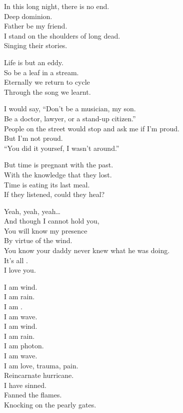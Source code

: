 
In this long night, there is no end. \\
Deep dominion. \\
Father be my friend. \\
I stand on the shoulders of  long dead. \\
Singing their stories. \\


Life is but an eddy. \\
So be a leaf in a stream. \\
Eternally we return to cycle \\
Through the song we learnt. \\


I would say, ``Don't be a musician, my son. \\
Be a doctor, lawyer, or a stand-up citizen.'' \\
People on the street would stop and ask me if I'm proud. \\
But I'm not proud. \\
``You did it yoursef, I wasn't around.'' \\


But time is pregnant with the past. \\
With the knowledge that they lost. \\
Time is eating its last meal. \\
If they listened, could they heal? \\


Yeah, yeah, yeah… \\
And though I cannot hold you, \\
You will know my presence \\
By virtue of the wind. \\
You know your daddy never knew what he was doing. \\
It's all . \\
I love you. \\


I am wind. \\
I am rain. \\
I am . \\
I am wave. \\
I am wind. \\
I am rain. \\
I am photon. \\
I am wave. \\
I am love, trauma, pain. \\
Reincarnate hurricane. \\
I have sinned. \\
Fanned the flames. \\
Knocking on the pearly gates. \\

